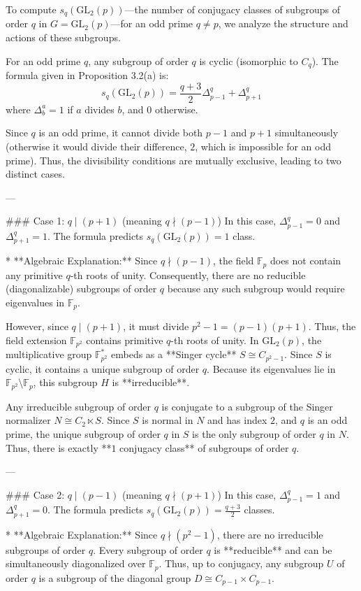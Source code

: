 To compute $s_q(\text{GL}_2(p))$—the number of conjugacy classes of subgroups of order $q$ in $G = \text{GL}_2(p)$—for an odd prime $q \neq p$, we analyze the structure and actions of these subgroups. 

For an odd prime $q$, any subgroup of order $q$ is cyclic (isomorphic to $C_q$). The formula given in Proposition 3.2(a) is:
$$s_q(\text{GL}_2(p)) = \frac{q+3}{2} \Delta^q_{p-1} + \Delta^q_{p+1}$$
where $\Delta^a_b = 1$ if $a$ divides $b$, and $0$ otherwise. 

Since $q$ is an odd prime, it cannot divide both $p-1$ and $p+1$ simultaneously (otherwise it would divide their difference, $2$, which is impossible for an odd prime). Thus, the divisibility conditions are mutually exclusive, leading to two distinct cases.

---

### Case 1: $q \mid (p+1)$ (meaning $q \nmid (p-1)$)
In this case, $\Delta^q_{p-1} = 0$ and $\Delta^q_{p+1} = 1$. The formula predicts $s_q(\text{GL}_2(p)) = 1$ class.

* **Algebraic Explanation:**
  Since $q \nmid (p-1)$, the field $\mathbb{F}_p$ does not contain any primitive $q$-th roots of unity. Consequently, there are no reducible (diagonalizable) subgroups of order $q$ because any such subgroup would require eigenvalues in $\mathbb{F}_p$.
  
  However, since $q \mid (p+1)$, it must divide $p^2 - 1 = (p-1)(p+1)$. Thus, the field extension $\mathbb{F}_{p^2}$ contains primitive $q$-th roots of unity. In $\text{GL}_2(p)$, the multiplicative group $\mathbb{F}_{p^2}^*$ embeds as a **Singer cycle** $S \cong C_{p^2-1}$. Since $S$ is cyclic, it contains a unique subgroup of order $q$. Because its eigenvalues lie in $\mathbb{F}_{p^2} \setminus \mathbb{F}_p$, this subgroup $H$ is **irreducible**.
  
  Any irreducible subgroup of order $q$ is conjugate to a subgroup of the Singer normalizer $N \cong C_2 \ltimes S$. Since $S$ is normal in $N$ and has index $2$, and $q$ is an odd prime, the unique subgroup of order $q$ in $S$ is the only subgroup of order $q$ in $N$. Thus, there is exactly **$1$ conjugacy class** of subgroups of order $q$.

---

### Case 2: $q \mid (p-1)$ (meaning $q \nmid (p+1)$)
In this case, $\Delta^q_{p-1} = 1$ and $\Delta^q_{p+1} = 0$. The formula predicts $s_q(\text{GL}_2(p)) = \frac{q+3}{2}$ classes.

* **Algebraic Explanation:**
  Since $q \nmid (p^2-1)$, there are no irreducible subgroups of order $q$. Every subgroup of order $q$ is **reducible** and can be simultaneously diagonalized over $\mathbb{F}_p$. Thus, up to conjugacy, any subgroup $U$ of order $q$ is a subgroup of the diagonal group $D \cong C_{p-1} \times C_{p-1}$.

